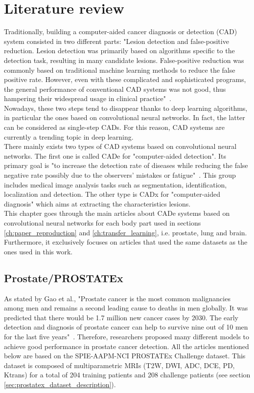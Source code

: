 
\chapter{Literature review}
\label{ch:literature_review}

Traditionally, building a computer-aided cancer diagnosis or detection (CAD) system consisted in two different parts: "Lesion  detection  and  false-positive  reduction.  Lesion  detection  was  primarily  based  on  algorithms  specific  to  the  detection task, resulting in many candidate lesions. False-positive reduction was commonly based on traditional  machine  learning  methods  to  reduce  the  false  positive  rate. However,  even  with  these  complicated and sophisticated programs, the general performance of conventional CAD systems was not good, thus hampering their widespread usage in clinical practice"~\cite{41}.\\
Nowadays, these two steps tend to disappear thanks to deep learning algorithms, in particular the ones based on convolutional neural networks. In fact, the latter can be considered as single-step CADs. For this reason, CAD systems are currently a trending topic in deep learning.\\
There mainly exists two types of CAD systems based on convolutional neural networks. The first one is called CADe for "computer-aided detection". Its primary goal is "to increase the detection rate of diseases while reducing the false negative  rate  possibly  due  to  the  observers’  mistakes  or  fatigue"~\cite{41}. This group includes medical  image  analysis  tasks  such  as  segmentation,  identification,  localization  and  detection. The other type is CADx for "computer-aided diagnosis" which aims at extracting the characteristics lesions.\\
This chapter goes through the main articles about CADe systems based on convolutional neural networks for each body part used in sections \ref{ch:paper_reproduction} and \ref{ch:transfer_learning}, i.e. prostate, lung and brain. Furthermore, it exclusively focuses on articles that used the same datasets as the ones used in this work.

\section{Prostate/PROSTATEx}
As stated by Gao et al., "Prostate  cancer  is  the  most  common  malignancies  among  men  and  remains  a  second  leading  cause to deaths in men globally. It was predicted that there would be 1.7 million new cancer cases by 2030. The early detection and diagnosis of prostate cancer can help to survive nine out of 10 men for the last five years"~\cite{41}. Therefore, researchers proposed many different models to achieve good performance in prostate cancer detection. All the articles mentioned below are based on the SPIE-AAPM-NCI PROSTATEx Challenge dataset. This dataset is composed of multiparametric MRIs (T2W, DWI, ADC, DCE, PD, Ktrans) for a total of 204 training patients and 208 challenge patients (see section \ref{sec:prostatex_dataset_description}).

